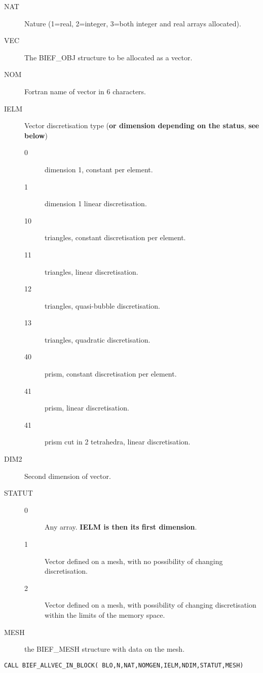 \begin{description}
\item [NAT] Nature (1=real, 2=integer, 3=both integer and real arrays allocated).
\item [VEC] The BIEF\_OBJ structure to be allocated as a vector.
\item [NOM] Fortran name of vector in 6 characters.
\item [IELM] Vector discretisation type (\textbf{or dimension depending on
  the status}, \textbf{see below})
\begin{description}
  \item [0] dimension 1, constant per element.
  \item [1] dimension 1 linear discretisation.
  \item [10] triangles, constant discretisation per element.
  \item [11] triangles, linear discretisation.
  \item [12] triangles, quasi-bubble discretisation.
  \item [13] triangles, quadratic discretisation.
  \item [40] prism, constant discretisation per element.
  \item [41] prism, linear discretisation.
  \item [41] prism cut in 2 tetrahedra, linear discretisation.
\end{description}
\item [DIM2] Second dimension of vector.
\item [STATUT]
 \begin{description}
   \item [0] Any array. \textbf{IELM is then its first dimension}.
   \item [1] Vector defined on a mesh, with no possibility of changing
     discretisation.
   \item [2] Vector defined on a mesh, with possibility of changing
     discretisation within the limits of the memory space.
\end{description}
\item [MESH] the BIEF\_MESH structure with data on the mesh.
\end{description}

\begin{lstlisting}[language=TelFortran]
CALL BIEF_ALLVEC_IN_BLOCK( BLO,N,NAT,NOMGEN,IELM,NDIM,STATUT,MESH)
\end{lstlisting}

